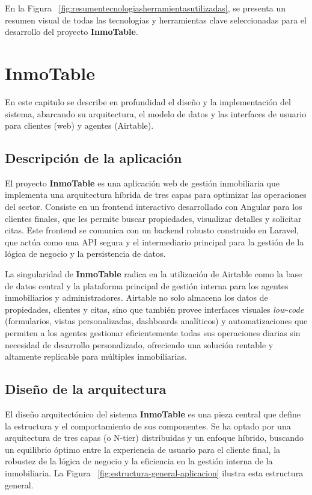 En la Figura ~\ref{fig:resumentecnologiasherramientasutilizadas}, se presenta un resumen visual de todas las tecnologías y herramientas clave seleccionadas para el desarrollo del proyecto \textbf{InmoTable}.


\chapter{InmoTable} 
\label{sec:inmotable}


En este capitulo se describe en profundidad el diseño y la implementación del sistema, abarcando su arquitectura, el modelo de datos y las interfaces de usuario para clientes (web) y agentes (Airtable).


\section{Descripción de la aplicación}


El proyecto \textbf{InmoTable} es una aplicación web de gestión inmobiliaria que implementa una arquitectura híbrida de tres capas para optimizar las operaciones del sector. Consiste en un frontend interactivo desarrollado con Angular para los clientes finales, que les permite buscar propiedades, visualizar detalles y solicitar citas. Este frontend se comunica con un backend robusto construido en Laravel, que actúa como una API segura y el intermediario principal para la gestión de la lógica de negocio y la persistencia de datos.

La singularidad de \textbf{InmoTable} radica en la utilización de Airtable como la base de datos central y la plataforma principal de gestión interna para los agentes inmobiliarios y administradores. Airtable no solo almacena los datos de propiedades, clientes y citas, sino que también provee interfaces visuales \textit{low-code} (formularios, vistas personalizadas, dashboards analíticos) y automatizaciones que permiten a los agentes gestionar eficientemente todas sus operaciones diarias sin necesidad de desarrollo personalizado, ofreciendo una solución rentable y altamente replicable para múltiples inmobiliarias.


\section{Diseño de la arquitectura}


El diseño arquitectónico del sistema \textbf{InmoTable} es una pieza central que define la estructura y el comportamiento de sus componentes. Se ha optado por una arquitectura de tres capas (o N-tier) distribuidas y un enfoque híbrido, buscando un equilibrio óptimo entre la experiencia de usuario para el cliente final, la robustez de la lógica de negocio y la eficiencia en la gestión interna de la inmobiliaria. La Figura ~\ref{fig:estructura-general-aplicacion} ilustra esta estructura general.

